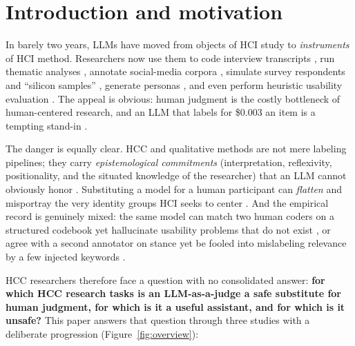 \section{Introduction and motivation}
In barely two years, LLMs have moved from objects of HCI study to \emph{instruments} of HCI method. Researchers now
use them to code interview transcripts \citep{xiao2023support,gao2024collabcoder}, run thematic analyses
\citep{depaoli2023inductive,dai2023llminloop}, annotate social-media corpora \citep{gilardi2023chatgpt,
tornberg2023political}, simulate survey respondents and ``silicon samples'' \citep{argyle2023outofone}, generate
personas \citep{salminen2024deusexmachina}, and even perform heuristic usability evaluation \citep{guerino2025gpt4ousability}.
The appeal is obvious: human judgment is the costly bottleneck of human-centered research, and an LLM that labels for
\$0.003 an item is a tempting stand-in \citep{gilardi2023chatgpt}.

The danger is equally clear. HCC and qualitative methods are not mere labeling pipelines; they carry
\emph{epistemological commitments} (interpretation, reflexivity, positionality, and the situated knowledge of the
researcher) that an LLM cannot obviously honor \citep{schroeder2025usestensions,davison2024ethics}. Substituting a
model for a human participant can \emph{flatten} and misportray the very identity groups HCI seeks to center
\citep{wang2024flatten,cheng2023compost}. And the empirical record is genuinely mixed: the same model can match two
human coders on a structured codebook \citep{dunivin2024scalablecot} yet hallucinate usability problems that do not
exist \citep{guerino2025gpt4ousability}, or agree with a second annotator on stance \citep{gilardi2023chatgpt} yet be
fooled into mislabeling relevance by a few injected keywords \citep{alaofi2024fooledrelevant}.

HCC researchers therefore face a question with no consolidated answer: \textbf{for which HCC research tasks is an
LLM-as-a-judge a safe substitute for human judgment, for which is it a useful assistant, and for which is it
unsafe?} This paper answers that question through three studies with a deliberate progression
(Figure~\ref{fig:overview}):

